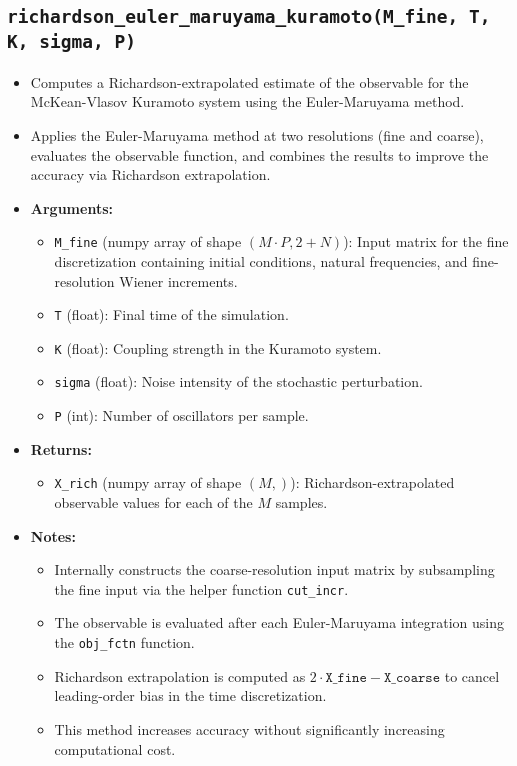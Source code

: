 \documentclass{article}
\begin{document}
\subsection{\texttt{richardson\_euler\_maruyama\_kuramoto(M\_fine, T, K, sigma, P)}}
\begin{itemize}
    \item Computes a Richardson-extrapolated estimate of the observable for the McKean-Vlasov Kuramoto system using the Euler-Maruyama method.
    \item Applies the Euler-Maruyama method at two resolutions (fine and coarse), evaluates the observable function, and combines the results to improve the accuracy via Richardson extrapolation.

    \item \textbf{Arguments:}
    \begin{itemize}
        \item \texttt{M\_fine} (numpy array of shape $(M \cdot P, 2 + N)$): Input matrix for the fine discretization containing initial conditions, natural frequencies, and fine-resolution Wiener increments.
        \item \texttt{T} (float): Final time of the simulation.
        \item \texttt{K} (float): Coupling strength in the Kuramoto system.
        \item \texttt{sigma} (float): Noise intensity of the stochastic perturbation.
        \item \texttt{P} (int): Number of oscillators per sample.
    \end{itemize}

    \item \textbf{Returns:}
    \begin{itemize}
        \item \texttt{X\_rich} (numpy array of shape $(M,)$): Richardson-extrapolated observable values for each of the $M$ samples.
    \end{itemize}

    \item \textbf{Notes:}
    \begin{itemize}
        \item Internally constructs the coarse-resolution input matrix by subsampling the fine input via the helper function \texttt{cut\_incr}.
        \item The observable is evaluated after each Euler-Maruyama integration using the \texttt{obj\_fctn} function.
        \item Richardson extrapolation is computed as $2 \cdot \texttt{X\_fine} - \texttt{X\_coarse}$ to cancel leading-order bias in the time discretization.
        \item This method increases accuracy without significantly increasing computational cost.
    \end{itemize}
\end{itemize}
\end{document}
